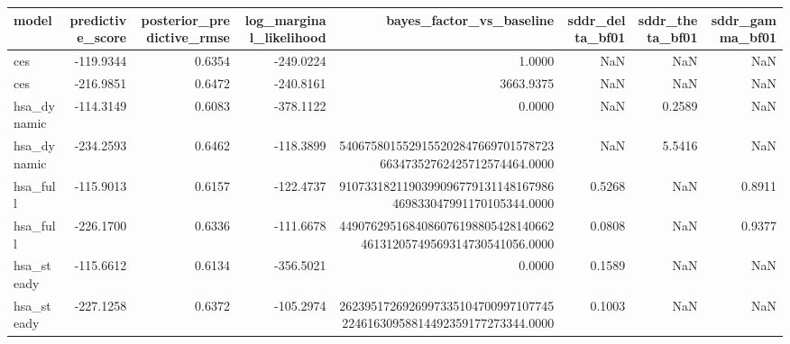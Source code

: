\begin{tabular}{lrrrrrrr}
\toprule
model & predictive\_score & posterior\_predictive\_rmse & log\_marginal\_likelihood & bayes\_factor\_vs\_baseline & sddr\_delta\_bf01 & sddr\_theta\_bf01 & sddr\_gamma\_bf01 \\
\midrule
ces & -119.9344 & 0.6354 & -249.0224 & 1.0000 & NaN & NaN & NaN \\
ces & -216.9851 & 0.6472 & -240.8161 & 3663.9375 & NaN & NaN & NaN \\
hsa\_dynamic & -114.3149 & 0.6083 & -378.1122 & 0.0000 & NaN & 0.2589 & NaN \\
hsa\_dynamic & -234.2593 & 0.6462 & -118.3899 & 540675801552915520284766970157872366347352762425712574464.0000 & NaN & 5.5416 & NaN \\
hsa\_full & -115.9013 & 0.6157 & -122.4737 & 9107331821190399096779131148167986469833047991170105344.0000 & 0.5268 & NaN & 0.8911 \\
hsa\_full & -226.1700 & 0.6336 & -111.6678 & 449076295168408607619880542814066246131205749569314730541056.0000 & 0.0808 & NaN & 0.9377 \\
hsa\_steady & -115.6612 & 0.6134 & -356.5021 & 0.0000 & 0.1589 & NaN & NaN \\
hsa\_steady & -227.1258 & 0.6372 & -105.2974 & 262395172692699733510470099710774522461630958814492359177273344.0000 & 0.1003 & NaN & NaN \\
\bottomrule
\end{tabular}
